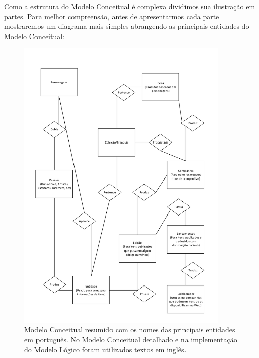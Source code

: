 \documentclass[12pt]{article}
\begin{document}
Como a estrutura do Modelo Conceitual é complexa dividimos sua ilustração em partes. Para melhor compreensão, antes de apresentarmos cada parte mostraremos um diagrama mais simples abrangendo as principais entidades do Modelo Conceitual:

\begin{figure}[H]
\centering
\includegraphics[height=0.8\textheight,width=0.9\textwidth]{MER_-_General.pdf}
\caption{Modelo Conceitual resumido com os nomes das principais entidades em português. No Modelo Conceitual detalhado e na implementação do Modelo Lógico foram utilizados textos em inglês.} \label{collection}
\end{figure}
\end{document}
